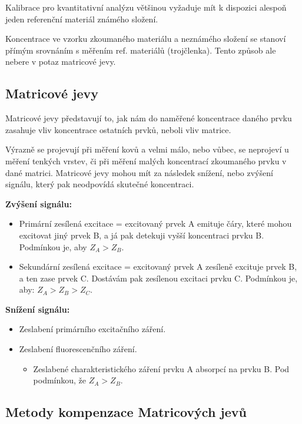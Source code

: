 Kalibrace pro kvantitativní analýzu většinou vyžaduje mít k dispozici alespoň jeden referenční materiál známého složení.

Koncentrace ve vzorku zkoumaného materiálu a neznámého složení se stanoví přímým srovnáním s měřením ref. materiálů (trojčlenka). Tento způsob ale nebere v potaz matricové jevy.

\subsection{Matricové jevy}

Matricové jevy představují to, jak nám do naměřené koncentrace daného prvku zasahuje vliv koncentrace ostatních prvků, neboli vliv matrice.

Výrazně se projevují při měření kovů a velmi málo, nebo vůbec, se neprojeví u měření tenkých vrstev, či při měření malých koncentrací zkoumaného prvku v dané matrici. Matricové jevy mohou mít za následek snížení, nebo zvýšení signálu, který pak neodpovídá skutečné koncentraci.

\textbf{Zvýšení signálu:}
\begin{itemize}
    \item Primární zesílená excitace = excitovaný prvek A emituje čáry, které mohou excitovat jiný prvek B, a já pak detekuji vyšší koncentraci prvku B. Podmínkou je, aby $Z_A > Z_B$.
    \item Sekundární zesílená excitace = excitovaný prvek A zesíleně excituje prvek B, a ten zase prvek C. Dostávám pak zesílenou excitaci prvku C. Podmínkou je, aby: $Z_A > Z_B > Z_C$.
\end{itemize}

\textbf{Snížení signálu:}
\begin{itemize}
    \item Zeslabení primárního excitačního záření.
    \item Zeslabení fluorescenčního záření.
    \begin{itemize}
        \item Zeslabené charakteristického záření prvku A absorpcí na prvku B. Pod podmínkou, že $Z_A > Z_B$.
    \end{itemize}
\end{itemize}

\subsection{Metody kompenzace Matricových jevů}

